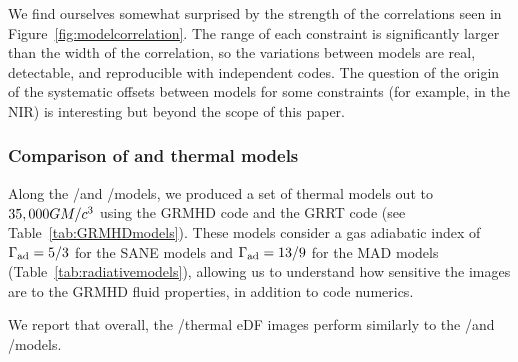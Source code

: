 We find ourselves somewhat surprised by the strength of the correlations seen in Figure~\ref{fig:modelcorrelation}.  The range of each constraint is significantly larger than the width of the correlation, so the variations between models are real, detectable, and reproducible with independent codes.  The question of the origin of the systematic offsets between models for some constraints (for example, in the NIR) is interesting but beyond the scope of this paper.   


\subsubsection{Comparison of \hamr and \kharma thermal models}

Along the \kharma/\ipole and \bhac/\bhoss models, we produced a set of thermal models out to $35,000GM/c^3$ using the GRMHD code \hamr and the GRRT code \bhoss (see Table~\ref{tab:GRMHDmodels}). These models consider a gas adiabatic index of $\Gamma_{\rm ad}=5/3$ for the SANE models and $\Gamma_{\rm ad}=13/9$ for the MAD models (Table~\ref{tab:radiativemodels}), allowing us to understand how sensitive the images are to the GRMHD fluid properties, in addition to code numerics. 

We report that overall, the \hamr/\bhoss thermal eDF images perform similarly to the \kharma/\ipole and \bhac/\bhoss models. 

